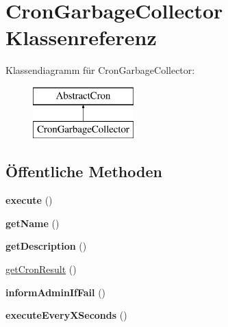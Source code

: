 \hypertarget{class_cron_garbage_collector}{}\section{Cron\+Garbage\+Collector Klassenreferenz}
\label{class_cron_garbage_collector}
Klassendiagramm für Cron\+Garbage\+Collector\+:\begin{figure}[H]
\begin{center}
\leavevmode
\includegraphics[height=2.000000cm]{class_cron_garbage_collector}
\end{center}
\end{figure}
\subsection*{Öffentliche Methoden}
\begin{DoxyCompactItemize}
\item 
\mbox{\label{class_cron_garbage_collector_a1abbc4e511360ba06c76af1ecaebe04e}} 
{\bfseries execute} ()
\item 
\mbox{\label{class_cron_garbage_collector_af7110b54e017af073c9d3053f3d61f76}} 
{\bfseries get\+Name} ()
\item 
\mbox{\label{class_cron_garbage_collector_a06af0c743d8a6a8d16ade0bb443b421b}} 
{\bfseries get\+Description} ()
\item 
\mbox{\hyperlink{class_cron_garbage_collector_acb6c3939fc7ea4a2a464e5f274266824}{get\+Cron\+Result}} ()
\item 
\mbox{\label{class_cron_garbage_collector_a2bc8a04f37f1f2417fd15323bb1823e7}} 
{\bfseries inform\+Admin\+If\+Fail} ()
\item 
\mbox{\label{class_cron_garbage_collector_a1873ddd3daefd91918b2b58025214b8f}} 
{\bfseries execute\+Every\+X\+Seconds} ()
\end{DoxyCompactItemize}


